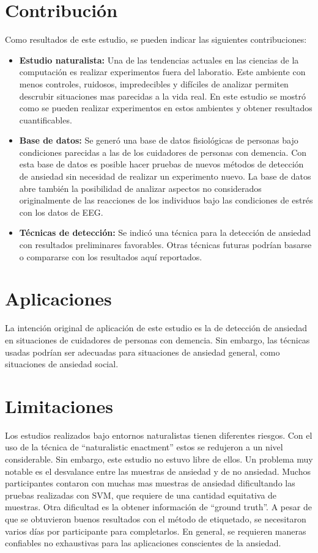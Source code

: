 \section{Contribuci\'on}
	Como resultados de este estudio, se pueden indicar las siguientes contribuciones:

	\begin{itemize}
		\item \textbf{Estudio naturalista:} Una de las tendencias actuales en las ciencias de la computaci\'on es realizar experimentos fuera del laboratio. Este ambiente con menos controles, ruidosos, impredecibles y dif\'iciles de analizar permiten descrubir situaciones mas parecidas a la vida real. En este estudio se mostr\'o como se pueden realizar experimentos en estos ambientes y obtener resultados cuantificables.

	\item \textbf{Base de datos:} Se gener\'o una base de datos fisiol\'ogicas de personas bajo condiciones parecidas a las de los cuidadores de personas con demencia. Con esta base de datos es posible hacer pruebas de nuevos m\'etodos de detecci\'on de ansiedad sin necesidad de realizar un experimento nuevo. La base de datos abre tambi\'en la posibilidad de analizar aspectos no considerados originalmente de las reacciones de los individuos bajo las condiciones de estr\'es con los datos de EEG.

		\item \textbf{T\'ecnicas de detecci\'on:} Se indic\'o una t\'ecnica para la detecci\'on de ansiedad con resultados preliminares favorables. Otras t\'ecnicas futuras podr\'ian basarse o compararse con los resultados aqu\'i reportados.
	\end{itemize}
\section{Aplicaciones}
	La intenci\'on original de aplicaci\'on de este estudio es la de detecci\'on de ansiedad en situaciones de cuidadores de personas con demencia. Sin embargo, las t\'ecnicas usadas podr\'ian ser adecuadas para situaciones de ansiedad general, como situaciones de ansiedad social.
\section{Limitaciones}
        Los estudios realizados bajo entornos naturalistas tienen diferentes riesgos. Con el uso de la t\'ecnica de ``naturalistic enactment'' estos se redujeron a un nivel considerable. Sin embargo, este estudio no estuvo libre de ellos. Un problema muy notable es el desvalance entre las muestras de ansiedad y de no ansiedad. Muchos participantes contaron con muchas mas muestras de ansiedad dificultando las pruebas realizadas con SVM, que requiere de una cantidad equitativa de muestras.
	Otra dificultad es la obtener informaci\'on de ``ground truth''. A pesar de que se obtuvieron buenos resultados con el m\'etodo de etiquetado, se necesitaron varios d\'ias por participante para completarlos. En general, se requieren maneras confiables no exhaustivas para las aplicaciones conscientes de la ansiedad.
